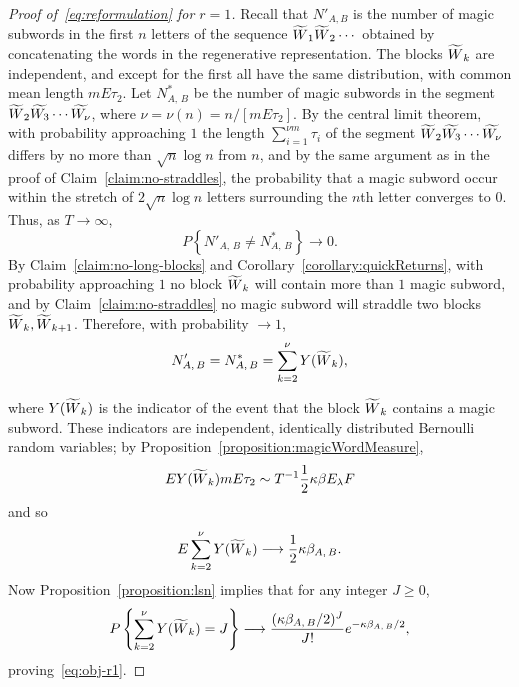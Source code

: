 \documentclass[AHL, Unicode, longabstracts, published]{cedram}
\let\oldtilde\tilde
\renewcommand*{\tilde}[1]{\mathchoice{\widetilde{#1}}{\widetilde{#1}}{\oldtilde{#1}}{\oldtilde{#1}}}\let\oldforall\forall
\renewcommand*{\forall}{\mathrel{\oldforall}}
\begin{document}
\begin{proof}[Proof of~\eqref{eq:reformulation} for $r= 1$]
Recall that $N'_{A,B}$ is the number of magic subwords in the first $n$ letters of the sequence $\tilde{W}_{1}\tilde{W}_{2}\dotsb$ obtained by concatenating the words in the regenerative representation. The blocks $\tilde{W}_{k}$ are independent, and except for the first all have the same distribution, with common mean length $mE\tau_{2}$. Let $N^{*}_{A,\,B}$ be the number of magic subwords in the segment $\tilde{W}_{2}\tilde{W_{3}}\dotsb \tilde{W_{\nu}}$, where $\nu =\nu (n)=n/[m E\tau_{2}]$. By the central limit theorem, with probability approaching $1$ the length $\sum_{i=1}^{\nu m}\tau_{i}$ of the segment $\tilde{W}_{2}\tilde{W_{3}}\dotsb \tilde{W_{\nu}}$ differs by no more than $\sqrt{n}\log n$ from $n$, and by the same argument as in the proof of Claim~\ref{claim:no-straddles}, the probability that a magic subword occur within the stretch of $2\sqrt{n}\log n$ letters surrounding the $n$th letter converges to $0$. Thus, as $T \rightarrow\infty$,
\[
P\left\{N'_{A,\,B}\not =N^{*}_{A,\,B} \right\} \longrightarrow 0.
\]
By Claim~\ref{claim:no-long-blocks} and Corollary~\ref{corollary:quickReturns}, with probability approaching $1$ no block $\tilde{W}_{k}$ will contain more than $1$ magic subword, and by Claim~\ref{claim:no-straddles} no magic subword will straddle two blocks $\tilde{W}_{k},\tilde{W}_{k+1}$. Therefore, with probability $\rightarrow 1$,
\[
N'_{A,\,B}=N^{*}_{A,\,B}=\sum_{k=2}^{\nu} Y(\tilde{W}_{k}),
\]

\goodbreak
\noindent where $Y(\tilde{W}_{k})$ is the indicator of the event that the block $\tilde{W}_{k}$ contains a magic subword. These indicators are independent, identically distributed Bernoulli random variables; by Proposition~\ref{proposition:magicWordMeasure},
\[
EY(\tilde{W}_{k}) mE\tau_{2} \sim T^{-1} \frac{1}{2} \kappa \beta E_{\lambda}F
\]
and so
\[
E\sum_{k=2}^{\nu} Y(\tilde{W}_{k}) \longrightarrow \frac{1}{2}
\kappa\beta_{A,\,B}.
\]
Now Proposition~\ref{proposition:lsn} implies that for any integer $J\geq 0$,
\[
P\left\{\sum_{k=2}^{\nu} Y(\tilde{W}_{k})=J \right\}\longrightarrow \frac{(\kappa
\beta_{A,\,B}/2)^{J}}{J!}e^{- \kappa \beta_{A,\,B}/2},
\]
proving~\eqref{eq:obj-r1}.
\end{proof}
\end{document}
